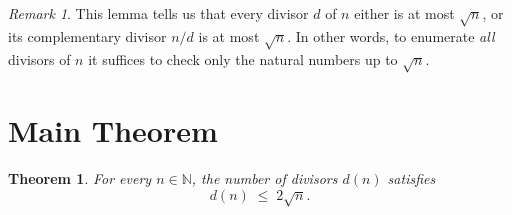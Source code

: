 \documentclass[12pt]{article}
\newtheorem{theorem}{Theorem}
\theoremstyle{remark}
\newtheorem*{remark}{Remark}
\begin{document}
\smallskip

\begin{remark}
This lemma tells us that every divisor $d$ of $n$ either is at most $\sqrt{n}$,
or its complementary divisor $n/d$ is at most $\sqrt{n}$.  In other words,
to enumerate \emph{all} divisors of $n$ it suffices to check only the
natural numbers up to $\sqrt{n}$.
\end{remark}

\section*{Main Theorem}

\begin{theorem}
For every $n \in \mathbb{N}$, the number of divisors $d(n)$ satisfies
\[
    d(n) \;\leq\; 2\sqrt{n}.
\]
\end{theorem}
\end{document}
